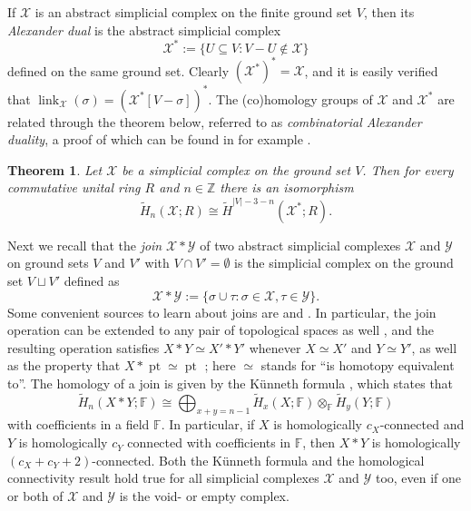 \documentclass[a4paper,11pt,reqno, english]{amsart}
\newtheorem{theorem}{Theorem}[section]
\theoremstyle{definition}
\theoremstyle{remark}
\newcommand\Z{\mathbb Z}
\DeclareMathOperator{\link}{\mathrm{link}}
\begin{document}
If $\mathscr{X}$ is an abstract simplicial complex on the finite ground set $V$, then its \emph{Alexander dual} is the abstract simplicial complex
\[
    \mathscr{X}^*:=\{U\subseteq V: V-U\notin \mathscr{X}\}
\]
defined on the same ground set. Clearly $(\mathscr{X}^*)^*=\mathscr{X}$, and it is easily verified that $\link_\mathscr{X}(\sigma)=(\mathscr{X}^*[V-\sigma])^*$. The (co)homology groups of $\mathscr{X}$ and $\mathscr{X}^*$ are related through the theorem below, referred to as \emph{combinatorial Alexander duality}, a proof of which can be found in for example \cite{BjornerTancer2009}.
\begin{theorem}\label{thm:alexander-duality}
    Let $\mathscr{X}$ be a simplicial complex on the ground set $V$. Then for every commutative unital ring $R$ and $n\in\Z$ there is an isomorphism
    \[
        \tilde{H}_n(\mathscr{X};R)\cong\tilde{H}^{|V|-3-n}(\mathscr{X}^*;R).
    \]
\end{theorem}

Next we recall that the \emph{join} $\mathscr{X}*\mathscr{Y}$ of two abstract simplicial complexes $\mathscr{X}$ and $\mathscr{Y}$ on ground sets $V$ and $V'$ with $V\cap V'=\emptyset$ is the simplicial complex on the ground set $V\sqcup V'$ defined as
\[
    \mathscr{X}*\mathscr{Y}:=\{\sigma\cup\tau:\sigma\in \mathscr{X},\tau\in \mathscr{Y}\}.
\]
Some convenient sources to learn about joins are \cite{Walker1988} and \cite{Whitehead1956}. In particular, the join operation can be extended to any pair of topological spaces as well \cite[p. 99]{Walker1988}, and the resulting operation satisfies $X*Y\simeq X'*Y'$ whenever $X\simeq X'$ and $Y\simeq Y'$, as well as the property that $X*\operatorname{pt}\simeq\operatorname{pt}$ \cite[p. 56]{Whitehead1956}; here $\simeq$ stands for ``is homotopy equivalent to''. The homology of a join is given by the K\"unneth formula \cite[Equation (2.3)]{Whitehead1956}, which states that
\begin{equation}
    \tilde{H}_n(X*Y;\mathbb{F})\cong\bigoplus_{x+y=n-1}\tilde{H}_x(X;\mathbb{F})\otimes_{\mathbb{F}}\tilde{H}_y(Y;\mathbb{F})
\end{equation}
with coefficients in a field $\mathbb{F}$. In particular, if $X$ is homologically $c_X$-connected and $Y$ is homologically $c_Y$ connected with coefficients in $\mathbb{F}$, then $X*Y$ is homologically $(c_X+c_Y+2)$-connected. Both the K\"unneth formula and the homological connectivity result hold true for all simplicial complexes $\mathscr{X}$ and $\mathscr{Y}$ too, even if one or both of $\mathscr{X}$ and $\mathscr{Y}$ is the void- or empty complex.
\end{document}
